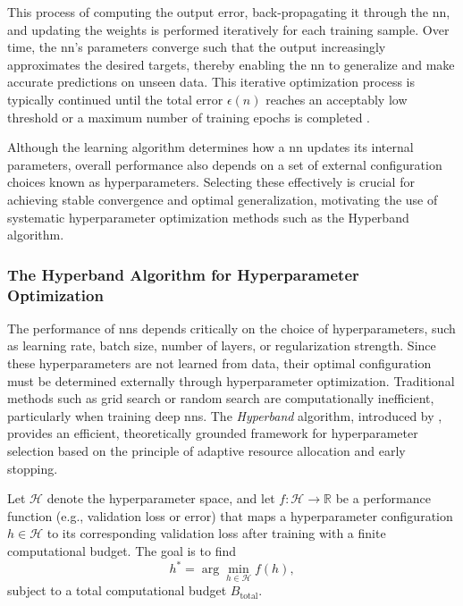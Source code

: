This process of computing the output error, back-propagating it through the \ac{nn}, and updating the weights is performed iteratively for each training sample. Over time, the \ac{nn}'s parameters converge such that the output increasingly approximates the desired targets, thereby enabling the \ac{nn} to generalize and make accurate predictions on unseen data. This iterative optimization process is typically continued until the total error $\epsilon(n)$ reaches an acceptably low threshold or a maximum number of training epochs is completed \parencite{sazli2006feedforwardnn}.

Although the learning algorithm determines how a \ac{nn} updates its internal parameters, overall performance also depends on a set of external configuration choices known as hyperparameters. Selecting these effectively is crucial for achieving stable convergence and optimal generalization, motivating the use of systematic hyperparameter optimization methods such as the Hyperband algorithm.

\subsubsection{The Hyperband Algorithm for Hyperparameter Optimization}
\label{subsec:hyperband_algorithm}
The performance of \ac{nn}s depends critically on the choice of hyperparameters, such as learning rate, batch size, number of layers, or regularization strength. Since these hyperparameters are not learned from data, their optimal configuration must be determined externally through hyperparameter optimization. Traditional methods such as grid search or random search are computationally inefficient, particularly when training deep \ac{nn}s. The \textit{Hyperband} algorithm, introduced by \textcite{li2017hyperband}, provides an efficient, theoretically grounded framework for hyperparameter selection based on the principle of adaptive resource allocation and early stopping.

Let $\mathcal{H}$ denote the hyperparameter space, and let $f : \mathcal{H} \rightarrow \mathbb{R}$ be a performance function (e.g., validation loss or error) that maps a hyperparameter configuration $h \in \mathcal{H}$ to its corresponding validation loss after training with a finite computational budget. The goal is to find
\begin{equation}
	h^* = \arg\min_{h \in \mathcal{H}} f(h),
	\label{eq:hyperband_objective}
\end{equation}
subject to a total computational budget $B_{\text{total}}$.

